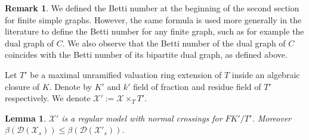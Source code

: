 \documentclass[a4paper,12pt,reqno]{amsart}
\newcommand\mc\mathcal
\newtheorem{lem}[thm]{Lemma}
\theoremstyle{definition}
\newtheorem{rem}[thm]{Remark}
\numberwithin{equation}{thm}
\renewcommand{\leq}{\leqslant}
\begin{document}
\begin{rem}
We defined the Betti number at the beginning of the second section for finite simple graphs. However, the same formula is used more generally in the literature to define the Betti number for any finite graph, such as for example the dual graph of $C$. We also observe that the Betti number of the dual graph of $C$ coincides with the Betti number of its bipartite dual graph, as defined above.
\end{rem}
Let $T'$ be a maximal unramified valuation ring extension of $T$ inside an algebraic closure of $K$. Denote by $K'$ and $k'$  field of fraction and residue field of $T'$ respectively. We denote 
$\mc{X}':= \mc{X} \times_T T'$. 

\begin{lem}\label{bettiinequality}
 $\mc{X}'$ is a regular model with normal crossings for $FK' /T'$. Moreover $\beta(\mc{D}(\mc{X}_s))\leq \beta(\mc{D}(\mc{X}'_s))$.
\end{lem}
\end{document}

